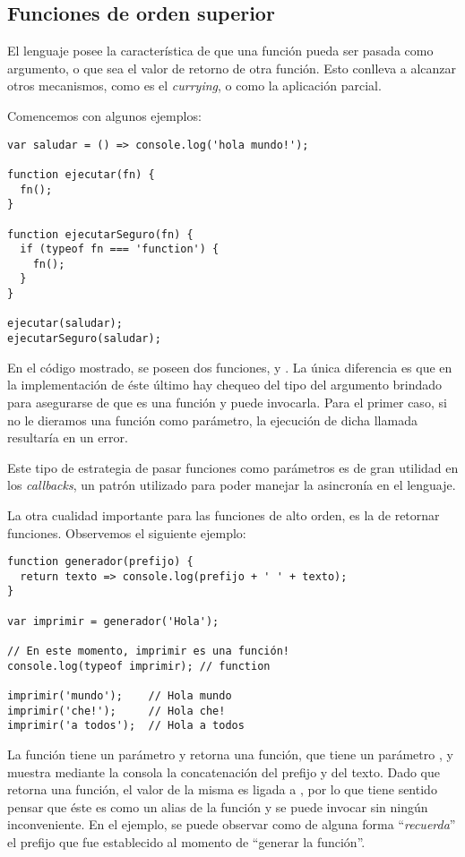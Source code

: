 \subsection{Funciones de orden superior}

El lenguaje posee la característica de que una función pueda ser pasada como argumento, o que sea el valor de retorno de otra función. Esto conlleva a alcanzar otros mecanismos, como es el \textit{currying}, o como la aplicación parcial.

Comencemos con algunos ejemplos:

\begin{lstlisting}[title={Pasando una función como argumento}]
var saludar = () => console.log('hola mundo!');

function ejecutar(fn) {
  fn();
}

function ejecutarSeguro(fn) {
  if (typeof fn === 'function') {
    fn();
  }
}

ejecutar(saludar);
ejecutarSeguro(saludar);
\end{lstlisting}

En el código mostrado, se poseen dos funciones,  y . La única diferencia es que en la implementación de éste último hay chequeo del tipo del argumento brindado para asegurarse de que es una función y puede invocarla. Para el primer caso, si no le dieramos una función como parámetro, la ejecución de dicha llamada resultaría en un error.

Este tipo de estrategia de pasar funciones como parámetros es de gran utilidad en los \textit{callbacks}, un patrón utilizado para poder manejar la asincronía en el lenguaje. 

La otra cualidad importante para las funciones de alto orden, es la de retornar funciones. Observemos el siguiente ejemplo:

\begin{lstlisting}[title={Retornando funciones}]
function generador(prefijo) {
  return texto => console.log(prefijo + ' ' + texto);
}

var imprimir = generador('Hola');

// En este momento, imprimir es una función!
console.log(typeof imprimir); // function

imprimir('mundo');    // Hola mundo
imprimir('che!');     // Hola che!
imprimir('a todos');  // Hola a todos
\end{lstlisting}

La función  tiene un parámetro  y retorna una función, que tiene un parámetro , y muestra mediante la consola la concatenación del prefijo y del texto. Dado que  retorna una función, el valor de la misma es ligada a , por lo que tiene sentido pensar que éste es como un alias de la función y se puede invocar sin ningún inconveniente. En el ejemplo, se puede observar como  de alguna forma "`\textit{recuerda}"' el prefijo que fue establecido al momento de "`generar la función"'.

